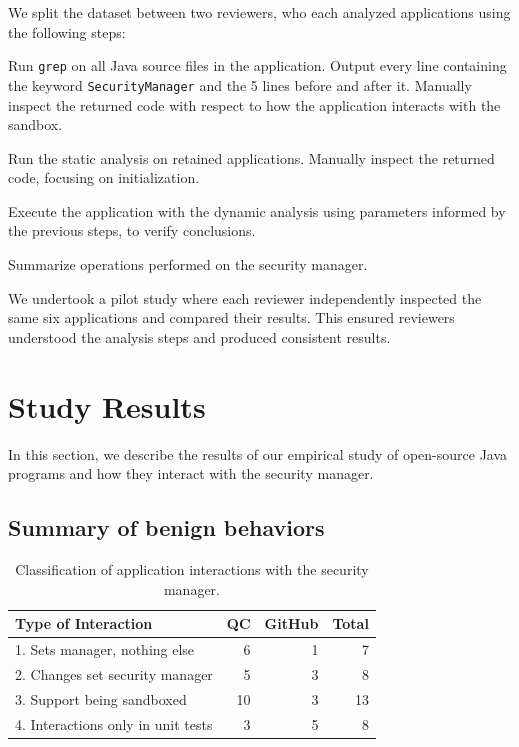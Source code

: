 \documentclass{sig-alternate}
\begin{document}
We split the dataset between two reviewers, who each analyzed
applications using the following steps:

\begin{flushenum}\setlength{\parskip}{0pt}
  \setlength{\parsep}{0pt}
  \setlength{\itemsep}{0pt}
\item Run \texttt{grep} on all Java source files in the application.
Output every line containing the keyword \texttt{SecurityManager} and the 5
lines before and after it.  Manually inspect the returned code with respect to
how the application interacts with the sandbox.
\item Run the static analysis on retained applications. Manually inspect the
  returned code, focusing on initialization. 
\item Execute the application with the dynamic analysis using parameters
  informed by the previous steps, 
to verify conclusions.
\item Summarize operations performed
on the security manager.
\end{flushenum}

We undertook a pilot study where each reviewer
independently inspected the same six applications and compared their
results. This ensured reviewers understood the analysis steps and produced
consistent results.


\section{Study Results}\label{sec:Study-results}

In this section, we describe the results of our empirical study of open-source
Java programs and how they interact with the security manager. 

\subsection{Summary of benign behaviors}\label{sub:Evaluation-of-the-hypotheses}


\begin{table}
\caption{Classification of application
  interactions \label{tab:Classification-of-Application}
with the security manager.}
\begin{tabular}{lrrr}
\toprule 
Type of Interaction & QC & GitHub & Total\tabularnewline
\midrule
1. Sets manager, nothing else & 6 & 1 & 7\tabularnewline
2. Changes set security manager & 5 & 3 & 8\tabularnewline
3. Support being sandboxed & 10 & 3 & 13\tabularnewline
4. Interactions only in unit tests & 3 & 5 & 8\tabularnewline
\bottomrule
\end{tabular}
\end{table}
\end{document}
